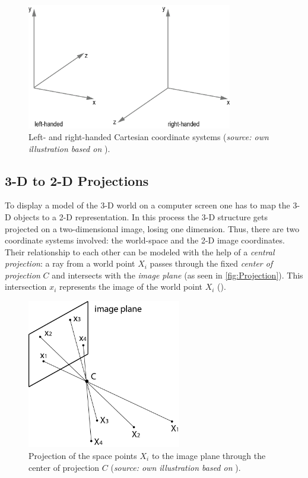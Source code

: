 \begin{figure}[htbp]
		\centering
		\includegraphics[width=0.8\textwidth]{figures/CoordinateSystems}
		\caption[Left- and right-handed Cartesian coordinate systems]{Left- and right-handed Cartesian coordinate systems (\textit{source: own illustration based on} \cite[p.167]{Gregory.2014}).}
		\label{fig:CoordinateSys}
\end{figure}

\subsection{3-D to 2-D Projections}
To display a model of the 3-D world on a computer screen one has to map the 3-D objects to a 2-D representation. In this process the 3-D structure gets projected on a two-dimensional image, losing one dimension. Thus, there are two coordinate systems involved: the world-space and the 2-D image coordinates. Their relationship to each other can be modeled with the help of a \textit{central projection}: a ray from a world point $X_i$ passes through the fixed \textit{center of projection} $C$ and intersects with the \textit{image plane} (as seen in \autoref{fig:Projection}). This intersection $x_i$ represents the image of the world point $X_i$ (\cite[p.6 et seq.]{Hartley.2011}).

\begin{figure}[htbp]
		\centering
		\includegraphics[width=0.6\textwidth]{figures/Projection}
		\caption[Projection of the space points $X_i$ to the image plane through $C$]{Projection of the space points $X_i$ to the image plane through the center of projection $C$ (\textit{source: own illustration based on} \cite[p.8]{Hartley.2011}).}
		\label{fig:Projection}
\end{figure}

